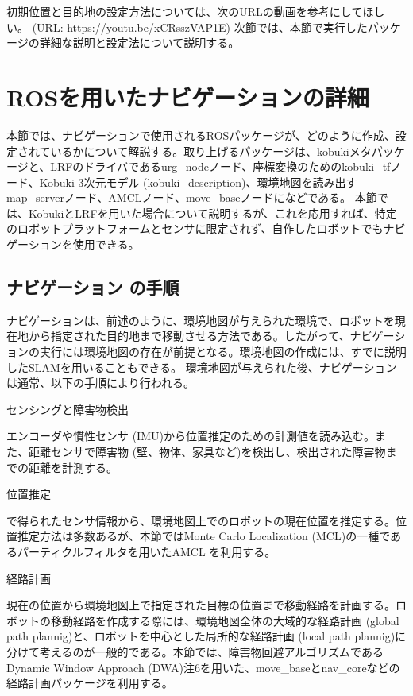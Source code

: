 初期位置と目的地の設定方法については、次のURLの動画を参考にしてほしい。 (URL: https://youtu.be/xCRsszVAP1E)
次節では、本節で実行したパッケージの詳細な説明と設定法について説明する。

\section{ROSを用いたナビゲーションの詳細}

本節では、ナビゲーションで使用されるROSパッケージが、どのように作成、設定されているかについて解説する。取り上げるパッケージは、kobukiメタパッケージと、LRFのドライバであるurg\_nodeノード、座標変換のためのkobuki\_tfノード、Kobuki 3次元モデル (kobuki\_description)、環境地図を読み出すmap\_serverノード、AMCLノード、move\_baseノードになどである。
本節では、KobukiとLRFを用いた場合について説明するが、これを応用すれば、特定のロボットプラットフォームとセンサに限定されず、自作したロボットでもナビゲーションを使用できる。

\subsection{ナビゲーション  の手順}

ナビゲーションは、前述のように、環境地図が与えられた環境で、ロボットを現在地から指定された目的地まで移動させる方法である。したがって、ナビゲーションの実行には環境地図の存在が前提となる。環境地図の作成には、すでに説明したSLAMを用いることもできる。
環境地図が与えられた後、ナビゲーションは通常、以下の手順により行われる。

\setcounter{num}{0}

\circled{\thenum} センシングと障害物検出

エンコーダや慣性センサ (IMU)から位置推定のための計測値を読み込む。また、距離センサで障害物 (壁、物体、家具など)を検出し、検出された障害物までの距離を計測する。

\circled{\thenum} 位置推定

 で得られたセンサ情報から、環境地図上でのロボットの現在位置を推定する。位置推定方法は多数あるが、本節ではMonte Carlo Localization (MCL)の一種であるパーティクルフィルタを用いたAMCL を利用する。

\circled{\thenum} 経路計画

現在の位置から環境地図上で指定された目標の位置まで移動経路を計画する。ロボットの移動経路を作成する際には、環境地図全体の大域的な経路計画 (global path plannig)と、ロボットを中心とした局所的な経路計画 (local path plannig)に分けて考えるのが一般的である。本節では、障害物回避アルゴリズムであるDynamic Window Approach (DWA)注6を用いた、move\_baseとnav\_coreなどの経路計画パッケージを利用する。


